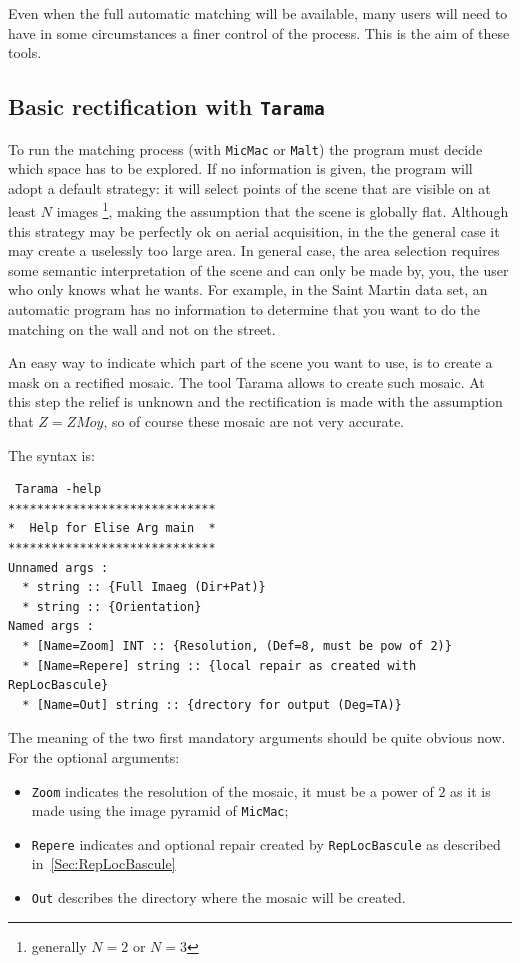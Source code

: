 \label{SemiAutoMatch}

Even when the full automatic matching will be available, many users will need to have
in some circumstances a finer control of the process. This is the aim of these tools.

\subsection{Basic rectification with {\tt Tarama}}

\label{Sec:Tarama}

To run the matching process (with {\tt MicMac} or {\tt Malt}) the
program must decide which space has to be explored. If no
information is given, the program will adopt a default strategy: it
will select points of the scene that are visible on at least $N$ images
\footnote{generally $N=2$ or $N=3$},
making the assumption that the scene is globally flat. Although this
strategy may be perfectly ok on aerial acquisition, in the the general
case it may create a uselessly too large area. In general case, the
area selection requires some semantic interpretation of the scene
and can only be made by, you, the user who only knows what he wants.
For example, in the Saint Martin data set, an automatic program has no
information to determine that you want to do the matching on the wall
and not on the street.

An easy way to indicate which part of the scene you want to use,
is to create a mask on a rectified mosaic. The tool Tarama allows
to create such mosaic. At this step the relief is unknown and the
rectification is made with the assumption that $Z=ZMoy$, so of
course these mosaic are not very accurate.

The syntax is:

\begin{verbatim}
 Tarama -help
*****************************
*  Help for Elise Arg main  *
*****************************
Unnamed args :
  * string :: {Full Imaeg (Dir+Pat)}
  * string :: {Orientation}
Named args :
  * [Name=Zoom] INT :: {Resolution, (Def=8, must be pow of 2)}
  * [Name=Repere] string :: {local repair as created with RepLocBascule}
  * [Name=Out] string :: {drectory for output (Deg=TA)}
\end{verbatim}

The meaning of the two first mandatory arguments should be quite obvious now.
For the optional arguments:

\begin{itemize}
   \item  {\tt Zoom} indicates the resolution of the mosaic, it must be a power
          of $2$ as it is made using the image pyramid of {\tt MicMac};

   \item  {\tt Repere} indicates and optional repair created by {\tt RepLocBascule}
          as described in~\ref{Sec:RepLocBascule}
   \item {\tt Out} describes the directory where the mosaic will be created.
\end{itemize}

